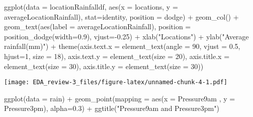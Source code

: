 \documentclass[
]{article}
\newenvironment{Shaded}{\begin{snugshade}}{\end{snugshade}}
\newcommand{\AttributeTok}[1]{\textcolor[rgb]{0.77,0.63,0.00}{#1}}
\newcommand{\DecValTok}[1]{\textcolor[rgb]{0.00,0.00,0.81}{#1}}
\newcommand{\FloatTok}[1]{\textcolor[rgb]{0.00,0.00,0.81}{#1}}
\newcommand{\FunctionTok}[1]{\textcolor[rgb]{0.00,0.00,0.00}{#1}}
\newcommand{\NormalTok}[1]{#1}
\newcommand{\SpecialCharTok}[1]{\textcolor[rgb]{0.00,0.00,0.00}{#1}}
\newcommand{\StringTok}[1]{\textcolor[rgb]{0.31,0.60,0.02}{#1}}
\begin{document}
\begin{Shaded}
\begin{Highlighting}[]
\FunctionTok{ggplot}\NormalTok{(}\AttributeTok{data =}\NormalTok{ locationRainfalldf, }
        \FunctionTok{aes}\NormalTok{(}\AttributeTok{x =}\NormalTok{ locations, }\AttributeTok{y =}\NormalTok{ averageLocationRainfall),}
        \AttributeTok{stat=}\StringTok{\textquotesingle{}identity\textquotesingle{}}\NormalTok{, }
        \AttributeTok{position =} \StringTok{\textquotesingle{}dodge\textquotesingle{}}\NormalTok{) }\SpecialCharTok{+} 
 \FunctionTok{geom\_col}\NormalTok{() }\SpecialCharTok{+} 
 \FunctionTok{geom\_text}\NormalTok{(}\FunctionTok{aes}\NormalTok{(}\AttributeTok{label =}\NormalTok{ averageLocationRainfall), }\AttributeTok{position =} \FunctionTok{position\_dodge}\NormalTok{(}\AttributeTok{width=}\FloatTok{0.9}\NormalTok{), }\AttributeTok{vjust=}\SpecialCharTok{{-}}\FloatTok{0.25}\NormalTok{) }\SpecialCharTok{+}
 \FunctionTok{xlab}\NormalTok{(}\StringTok{"Locations"}\NormalTok{) }\SpecialCharTok{+} 
 \FunctionTok{ylab}\NormalTok{(}\StringTok{"Average rainfall(mm)"}\NormalTok{) }\SpecialCharTok{+}
 \FunctionTok{theme}\NormalTok{(}\AttributeTok{axis.text.x =} \FunctionTok{element\_text}\NormalTok{(}\AttributeTok{angle =} \DecValTok{90}\NormalTok{, }\AttributeTok{vjust =} \FloatTok{0.5}\NormalTok{, }\AttributeTok{hjust=}\DecValTok{1}\NormalTok{, }\AttributeTok{size =} \DecValTok{18}\NormalTok{),}
       \AttributeTok{axis.text.y =} \FunctionTok{element\_text}\NormalTok{(}\AttributeTok{size =} \DecValTok{20}\NormalTok{),}
       \AttributeTok{axis.title.x =} \FunctionTok{element\_text}\NormalTok{(}\AttributeTok{size =} \DecValTok{30}\NormalTok{),}
       \AttributeTok{axis.title.y =} \FunctionTok{element\_text}\NormalTok{(}\AttributeTok{size =} \DecValTok{30}\NormalTok{))}
\end{Highlighting}
\end{Shaded}

\texttt{[image: EDA\_review-3\_files/figure-latex/unnamed-chunk-4-1.pdf]}

\begin{Shaded}
\begin{Highlighting}[]
\FunctionTok{ggplot}\NormalTok{(}\AttributeTok{data =}\NormalTok{ rain) }\SpecialCharTok{+}
  \FunctionTok{geom\_point}\NormalTok{(}\AttributeTok{mapping =} \FunctionTok{aes}\NormalTok{(}\AttributeTok{x =}\NormalTok{ Pressure9am , }\AttributeTok{y =}\NormalTok{ Pressure3pm), }\AttributeTok{alpha=}\FloatTok{0.3}\NormalTok{) }\SpecialCharTok{+}
\FunctionTok{ggtitle}\NormalTok{(}\StringTok{"Pressure9am and Pressure3pm"}\NormalTok{)}
\end{Highlighting}
\end{Shaded}
\end{document}
